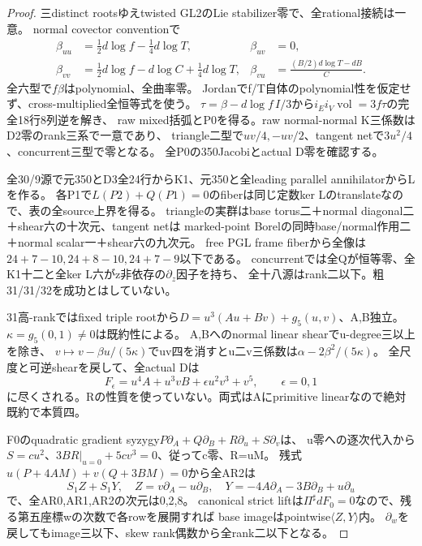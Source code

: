 \documentclass[a4paper,11pt]{ltjsarticle}
\theoremstyle{definition}
\begin{document}
\begin{proof}
三distinct rootsゆえtwisted GL2のLie stabilizer零で、全rational接続は一意。
normal covector conventionで
\[
\begin{aligned}
 \beta_{uu}&=\tfrac12d\log f-\tfrac14d\log T,&\beta_{uv}&=0,\\
 \beta_{vv}&=\tfrac12d\log f-d\log C+\tfrac14d\log T,&
 \beta_{vu}&=\frac{(B/2)d\log T-dB}{C}.
\end{aligned}
\]
全六型で$f\beta$はpolynomial、全曲率零。
Jordanでf/T自体のpolynomial性を仮定せず、cross-multiplied全恒等式を使う。
$\tau=\beta-d\log f\,I/3$から$i_Ei_V\operatorname{vol}=3f\tau$の完全18行8列逆を解き、
raw mixed括弧とP0を得る。raw normal-normal K三係数はD2零のrank三系で一意であり、
triangle二型で$uv/4,-uv/2$、tangent netで$3u^2/4$、concurrent三型で零となる。
全P0の350Jacobiとactual D零を確認する。

全30/9源で元350とD3全24行からK1、元350と全leading parallel annihilatorからLを作る。
各P1で$L(P2)+Q(P1)=0$のfiberは同じ定数ker Lのtranslateなので、表の全source上界を得る。
triangleの実群はbase torus二＋normal diagonal二＋shear六の十次元、tangent netは
marked-point Borelの同時base/normal作用二＋normal scalar一＋shear六の九次元。
free PGL frame fiberから全像は$24+7-10,24+8-10,24+7-9$以下である。
concurrentでは全Qが恒等零、全K1十二と全ker L六がz非依存の$\partial_z$因子を持ち、
全十八源はrank二以下。粗31/31/32を成功とはしていない。

31高-rankではfixed triple rootから$D=u^3(Au+Bv)+g_5(u,v)$、A,B独立。
$\kappa=g_5(0,1)\ne0$は既約性による。
A,Bへのnormal linear shearでu-degree三以上を除き、
$v\mapsto v-\beta u/(5\kappa)$でuv四を消すとu二v三係数は$\alpha-2\beta^2/(5\kappa)$。
全尺度と可逆shearを戻して、全actual Dは
\[
 F_\epsilon=u^4A+u^3vB+\epsilon u^2v^3+v^5,\qquad\epsilon=0,1
\]
に尽くされる。Rの性質を使っていない。両式はAにprimitive linearなので絶対既約で本質四。

F0のquadratic gradient syzygy$P\partial_A+Q\partial_B+R\partial_u+S\partial_v$は、
u零への逐次代入から$S=cu^2$、$3BR|_{u=0}+5cv^3=0$、従ってc零、R=uM。
残式$u(P+4AM)+v(Q+3BM)=0$から全AR2は
\[
 S_1Z+S_1Y,\quad Z=v\partial_A-u\partial_B,\quad
 Y=-4A\partial_A-3B\partial_B+u\partial_u
\]
で、全AR0,AR1,AR2の次元は0,2,8。
canonical strict liftは$\Pi^\sharp dF_0=0$なので、残る第五座標wの次数で各rowを展開すれば
base imageはpointwise$\langle Z,Y\rangle$内。
$\partial_w$を戻してもimage三以下、skew rank偶数から全rank二以下となる。


\end{proof}
\end{document}
